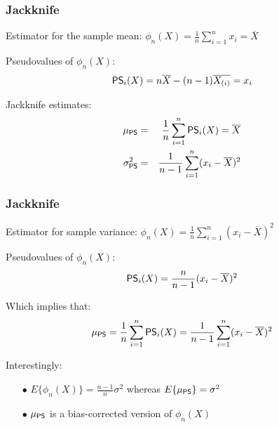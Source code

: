 \begin{frame}
  \frametitle{Jackknife \cont}

  \begin{example}
    \small
    Estimator for the sample mean: $\phi_n(X) = \frac{1}{n} \sum_{i=1}^n x_i = \overline{X}$ \\[.3cm] \pause 
    
    Pseudovalues of $\phi_n(X)$:
    \begin{displaymath}
      {\mathop{\mathsf{PS}}}_i(X) = n\overline{X} - (n-1) \overline{X_{(i)}} = x_i
    \end{displaymath}
    \pause
    
    Jackknife estimates:
    \begin{eqnarray*}
      \mu_{{\mathop{\mathsf{PS}}}}      &=& \frac{1}{n} \sum_{i=1}^n {\mathop{\mathsf{PS}}}_i(X) = \overline{X} \\
      \sigma_{{\mathop{\mathsf{PS}}}}^2 &=& \frac{1}{n-1} \sum_{i=1}^n (x_i - \overline{X})^2
    \end{eqnarray*}
  \end{example}
\end{frame}


\begin{frame}
  \frametitle{Jackknife \cont}

  \begin{example}
    \small
    Estimator for sample variance: $\phi_n(X) = \frac{1}{n} \sum_{i=1}^n (x_i - \overline{X})^2$ \\[.3cm] \pause
    
    Pseudovalues of $\phi_n(X)$:
    {\footnotesize
    \begin{displaymath}
      {\mathop{\mathsf{PS}}}_i(X) = \frac{n}{n-1} (x_i - \overline{X})^2
    \end{displaymath}
    }
    \pause

    Which implies that:
    {\footnotesize
    \begin{displaymath}
      \mu_{{\mathop{\mathsf{PS}}}} = \frac{1}{n} \sum_{i=1}^n {\mathop{\mathsf{PS}}}_i(X) = \frac{1}{n-1} \sum_{i=1}^n (x_i - \overline{X})^2
    \end{displaymath}
    }
    \pause

    {\color{gr3} Interestingly:}
    
    \begin{itemize}
      \item[\color{gr3} $\bullet$] $E\{\phi_n(X)\} = \frac{n-1}{n}\sigma^2$ whereas $E\{ \mu_{{\mathop{\mathsf{PS}}}} \} = \sigma^2$
      \item[\color{gr3} $\bullet$] $\mu_{{\mathop{\mathsf{PS}}}}$ is a bias-corrected version of $\phi_n(X)$
    \end{itemize}
  \end{example}
\end{frame}


